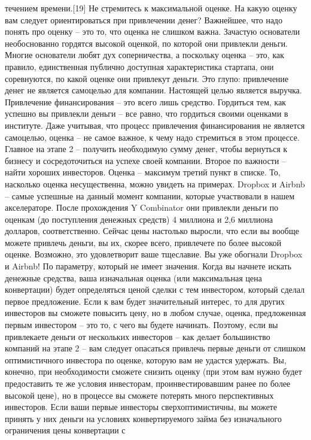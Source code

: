 \documentclass[ebook,12pt,oneside,openany]{memoir}
\begin{document}
течением времени.[19] Не стремитесь к максимальной оценке. На какую
оценку вам следует ориентироваться при привлечении денег? Важнейшее,
что надо понять про оценку – это то, что оценка не слишком важна.
Зачастую основатели необоснованно гордятся высокой оценкой, по которой
они привлекли деньги. Многие основатели любят дух соперничества, а
поскольку оценка – это, как правило, единственная публично доступная
характеристика стартапа, они соревнуются, по какой оценке они
привлекут деньги. Это глупо: привлечение денег не является самоцелью
для компании. Настоящей целью является выручка. Привлечение
финансирования – это всего лишь средство. Гордиться тем, как успешно
вы привлекли деньги – все равно, что гордиться своими оценками в
институте. Даже учитывая, что процесс привлечения финансирования не
является самоцелью, оценка – не самое важное, к чему надо стремиться в
этом процессе. Главное на этапе 2 – получить необходимую сумму денег,
чтобы вернуться к бизнесу и сосредоточиться на успехе своей компании.
Второе по важности – найти хороших инвесторов. Оценка – максимум
третий пункт в списке. То, насколько оценка несущественна, можно
увидеть на примерах. Dropbox и Airbnb – самые успешные на данный
момент компании, которые участвовали в нашем акселераторе. После
прохождения Y Combinator они привлекли деньги по оценкам (до
поступления денежных средств) 4 миллиона и 2,6 миллиона долларов,
соответственно. Сейчас цены настолько выросли, что если вы вообще
можете привлечь деньги, вы их, скорее всего, привлечете по более
высокой оценке. Возможно, это удовлетворит ваше тщеславие. Вы уже
обогнали Dropbox и Airbnb! По параметру, который не имеет значения.
Когда вы начнете искать денежные средства, ваша изначальная оценка
(или максимальная цена конвертации) будет определяться ценой сделки с
тем инвестором, который сделал первое предложение. Если к вам будет
значительный интерес, то для других инвесторов вы сможете повысить
цену, но в любом случае, оценка, предложенная первым инвестором – это
то, с чего вы будете начинать. Поэтому, если вы привлекаете деньги от
нескольких инвесторов – как делает большинство компаний на этапе 2 –
вам следует опасаться привлечь первые деньги от слишком оптимистичного
инвестора по оценке, которую вам не удастся удержать. Вы, конечно, при
необходимости сможете снизить оценку (при этом вам нужно будет
предоставить те же условия инвесторам, проинвестировавшим ранее по
более высокой цене), но в процессе вы сможете потерять много
перспективных инвесторов. Если ваши первые инвесторы
сверхоптимистичны, вы можете принять у них деньги на условиях
конвертируемого займа без изначального ограничения цены конвертации с
\end{document}
